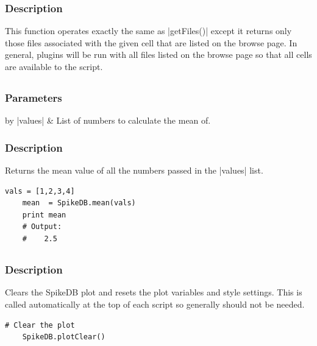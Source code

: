 \documentclass{report}
\begin{document}
\subsubsection{Description}
This function operates exactly the same as |getFiles()| except it returns only those files associated with the given cell that are listed on the browse page. In general, plugins will be run with all files listed on the browse page so that all cells are available to the script. 

\clearpage
\subsection[\method{float}{mean}]{}
\subsubsection{Parameters}
\begin{table}[h]
\begin{center}
\begin{tabular}{by}
		|values| & List of numbers to calculate the mean of.\\
	\end{tabular}
\end{center}
\end{table}
\subsubsection{Description}
Returns the mean value of all the numbers passed in the |values| list.
\begin{lstlisting}[caption=Example]
	vals = [1,2,3,4]
	mean  = SpikeDB.mean(vals)
	print mean
	# Output:
	#    2.5
\end{lstlisting}

\clearpage
\subsection{}
\subsubsection{Description}
Clears the SpikeDB plot and resets the plot variables and style settings. This is called automatically at the top of each script so generally should not be needed.
\begin{lstlisting}[caption=Example]
	# Clear the plot
	SpikeDB.plotClear()
\end{lstlisting}
\end{document}
